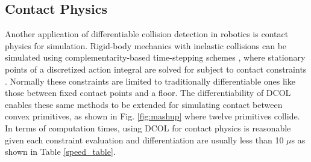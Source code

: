 \subsection{Contact Physics}
Another application of differentiable collision detection in robotics is contact physics for simulation. Rigid-body mechanics with inelastic collisions can be simulated using complementarity-based time-stepping schemes \cite{howell2022}, where stationary points of a discretized action integral are solved for subject to contact constraints \cite{marsden2001}.  Normally these constraints are limited to traditionally differentiable ones like those between fixed contact points and a floor.  The differentiability of DCOL enables these same methods to be extended for simulating contact between convex primitives, as shown in Fig. \eqref{fig:mashup} where twelve primitives collide.  In terms of computation times, using DCOL for contact physics is reasonable given each constraint evaluation and differentiation are usually less than 10 $\mu$s as shown in Table \ref{speed_table}.
